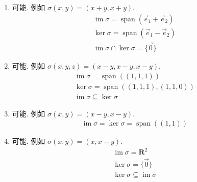 \documentclass[12pt,fontset=fandol]{ctexart}
\begin{document}
\begin{solve}
\begin{enumerate}
                \item 可能. 例如 $ \sigma(x, y) = (x + y, x + y) $.
                      \begin{gather*}
                          \operatorname{im} \sigma = \operatorname{span}(\vec{e}_1 + \vec{e}_2) \\
                          \ker \sigma = \operatorname{span}(\vec{e}_1 - \vec{e}_2) \\
                          \operatorname{im} \sigma \cap \ker \sigma = \{\vec{0}\}
                      \end{gather*}

                \item 可能. 例如 $ \sigma(x, y, z) = (x - y, x - y, x - y) $.
                      \begin{gather*}
                          \operatorname{im} \sigma = \operatorname{span}((1, 1, 1)) \\
                          \ker \sigma = \operatorname{span}((1, 1, 1), (1, 1, 0)) \\
                          \operatorname{im} \sigma \subseteq \ker \sigma
                      \end{gather*}

                \item 可能. 例如 $ \sigma(x, y) = (x - y, x - y) $.
                      \begin{gather*}
                          \operatorname{im} \sigma = \ker \sigma = \operatorname{span}((1, 1))
                      \end{gather*}

                \item 可能. 例如 $ \sigma(x, y) = (x, x - y) $.
                      \begin{gather*}
                          \operatorname{im} \sigma = \mathbf{R}^2 \\
                          \ker \sigma = \{\vec{0}\} \\
                          \ker \sigma \subseteq \operatorname{im} \sigma
                      \end{gather*}
            \end{enumerate}
\end{solve}
\end{document}

